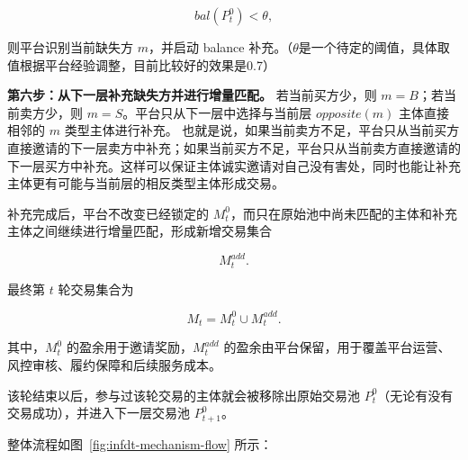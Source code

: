 \documentclass[UTF8,11pt]{ctexart}
\begin{document}
\[
    bal(P_t^0)<\theta,
\]

则平台识别当前缺失方 \(m\)，并启动 balance 补充。（$\theta$是一个待定的阈值，具体取值根据平台经验调整，目前比较好的效果是0.7）

\textbf{第六步：从下一层补充缺失方并进行增量匹配。}
若当前买方少，则 \(m=B\)；若当前卖方少，则 \(m=S\)。平台只从下一层中选择与当前层 \(opposite(m)\) 主体直接相邻的 \(m\) 类型主体进行补充。
也就是说，如果当前卖方不足，平台只从当前买方直接邀请的下一层卖方中补充；如果当前买方不足，平台只从当前卖方直接邀请的下一层买方中补充。这样可以保证主体诚实邀请对自己没有害处，同时也能让补充主体更有可能与当前层的相反类型主体形成交易。

补充完成后，平台不改变已经锁定的 \(M_t^0\)，而只在原始池中尚未匹配的主体和补充主体之间继续进行增量匹配，形成新增交易集合

\[
    M_t^{add}.
\]

最终第 \(t\) 轮交易集合为

\[
    M_t=M_t^0\cup M_t^{add}.
\]

其中，\(M_t^0\) 的盈余用于邀请奖励，\(M_t^{add}\) 的盈余由平台保留，用于覆盖平台运营、风控审核、履约保障和后续服务成本。

该轮结束以后，参与过该轮交易的主体就会被移除出原始交易池 \(P_t^0\)（无论有没有交易成功），并进入下一层交易池 \(P_{t+1}^0\)。

整体流程如图~\ref{fig:infdt-mechanism-flow} 所示：
\end{document}
